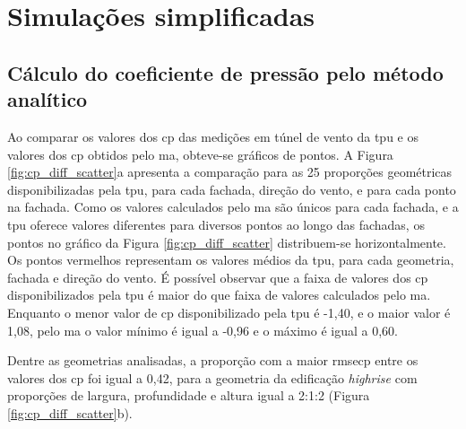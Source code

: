 \documentclass[brazil,hardcopy,openany]{ufscthesis} %
\begin{document}
\section{Simulações simplificadas}

\subsection*{Cálculo do coeficiente de pressão pelo método analítico}

Ao comparar os valores dos \acrfull{cp} das medições em túnel de vento da \acrfull{tpu} e os valores dos \acrshort{cp} obtidos pelo \acrlong{ma}, obteve-se gráficos de pontos. 
A Figura \ref{fig:cp_diff_scatter}a apresenta a comparação para as 25 proporções geométricas disponibilizadas pela \acrshort{tpu}, para cada fachada, direção do vento, e para cada ponto na fachada.
Como os valores calculados pelo \acrlong{ma} são únicos para cada fachada, e a \acrshort{tpu} oferece valores diferentes para diversos pontos ao longo das fachadas, os pontos no gráfico da Figura \ref{fig:cp_diff_scatter} distribuem-se horizontalmente.
Os pontos vermelhos representam os valores médios da \acrshort{tpu}, para cada geometria, fachada e direção do vento.
É possível observar que a faixa de valores dos \acrshort{cp} disponibilizados pela \acrshort{tpu} é maior do que  faixa de valores calculados pelo \acrlong{ma}. Enquanto o menor valor de \acrshort{cp} disponibilizado pela \acrshort{tpu} é \mbox{-1,40}, e o maior valor é 1,08, pelo \acrlong{ma} o valor mínimo é igual a -0,96 e o máximo é igual a 0,60.

Dentre as geometrias analisadas, a proporção com a maior \gls{rmsecp} entre os valores dos \acrshort{cp} foi igual a 0,42, para a geometria da edificação \textit{highrise} com proporções de largura, profundidade e altura igual a 2:1:2 (Figura \ref{fig:cp_diff_scatter}b).

\vspace{40pt}
\newpage
\end{document}
